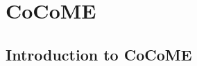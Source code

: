 \chapter{CoCoME}
\label{ch:CoCoME}

\section{Introduction to CoCoME}
\label{sec:CoCoME:Introduction}
